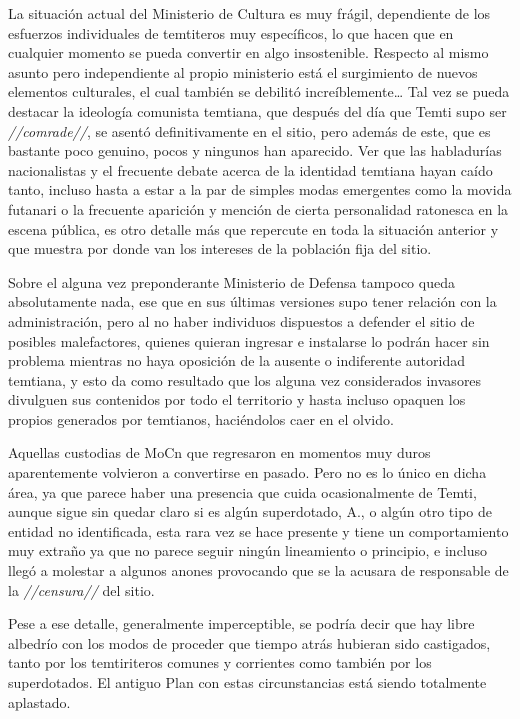 \documentclass[
  spanish,
]{book}
\begin{document}
La situación actual del Ministerio de Cultura es muy frágil, dependiente de los esfuerzos individuales de temtiteros muy específicos, lo que hacen que en cualquier momento se pueda convertir en algo insostenible. Respecto al mismo asunto pero independiente al propio ministerio está el surgimiento de nuevos elementos culturales, el cual también se debilitó increíblemente\ldots{} Tal vez se pueda destacar la ideología comunista temtiana, que después del día que Temti supo ser \emph{//comrade//}, se asentó definitivamente en el sitio, pero además de este, que es bastante poco genuino, pocos y ningunos han aparecido. Ver que las habladurías nacionalistas y el frecuente debate acerca de la identidad temtiana hayan caído tanto, incluso hasta a estar a la par de simples modas emergentes como la movida futanari o la frecuente aparición y mención de cierta personalidad ratonesca en la escena pública, es otro detalle más que repercute en toda la situación anterior y que muestra por donde van los intereses de la población fija del sitio.

Sobre el alguna vez preponderante Ministerio de Defensa tampoco queda absolutamente nada, ese que en sus últimas versiones supo tener relación con la administración, pero al no haber individuos dispuestos a defender el sitio de posibles malefactores, quienes quieran ingresar e instalarse lo podrán hacer sin problema mientras no haya oposición de la ausente o indiferente autoridad temtiana, y esto da como resultado que los alguna vez considerados invasores divulguen sus contenidos por todo el territorio y hasta incluso opaquen los propios generados por temtianos, haciéndolos caer en el olvido.

Aquellas custodias de MoCn que regresaron en momentos muy duros aparentemente volvieron a convertirse en pasado. Pero no es lo único en dicha área, ya que parece haber una presencia que cuida ocasionalmente de Temti, aunque sigue sin quedar claro si es algún superdotado, A., o algún otro tipo de entidad no identificada, esta rara vez se hace presente y tiene un comportamiento muy extraño ya que no parece seguir ningún lineamiento o principio, e incluso llegó a molestar a algunos anones provocando que se la acusara de responsable de la \emph{//censura//} del sitio.

Pese a ese detalle, generalmente imperceptible, se podría decir que hay libre albedrío con los modos de proceder que tiempo atrás hubieran sido castigados, tanto por los temtiriteros comunes y corrientes como también por los superdotados. El antiguo Plan con estas circunstancias está siendo totalmente aplastado.
\end{document}
